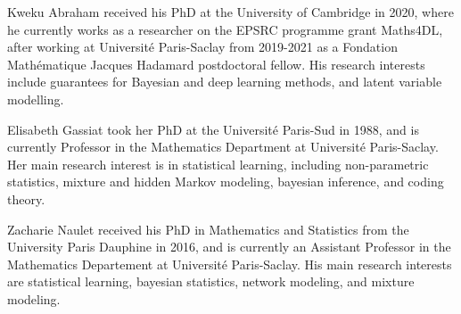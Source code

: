 \documentclass[journal]{IEEEtran}
\newcommand{\1}{\boldsymbol{1}}
\begin{document}
\begin{IEEEbiographynophoto}{Kweku Abraham}
  received his PhD at the University of Cambridge in 2020, where he currently works as a researcher on the EPSRC programme grant Maths4DL, after working at Université Paris-Saclay from 2019-2021 as a Fondation Mathématique Jacques Hadamard postdoctoral fellow. His research interests include guarantees for Bayesian and deep learning methods, and latent variable modelling.
\end{IEEEbiographynophoto}

\begin{IEEEbiographynophoto}{Elisabeth Gassiat}
  took her PhD at the Université Paris-Sud in 1988, and is currently
  Professor in the Mathematics Department at Université Paris-Saclay. Her main
  research interest is in statistical learning, including non-parametric
  statistics, mixture and hidden Markov modeling, bayesian inference, and coding
  theory.
\end{IEEEbiographynophoto}

\begin{IEEEbiographynophoto}{Zacharie Naulet}
  received his PhD in Mathematics and Statistics from the University Paris Dauphine in 2016, and is currently an Assistant Professor in the Mathematics Departement at Université Paris-Saclay. His main research interests are statistical learning, bayesian statistics, network modeling, and mixture modeling.
\end{IEEEbiographynophoto}




\vfill
\end{document}
